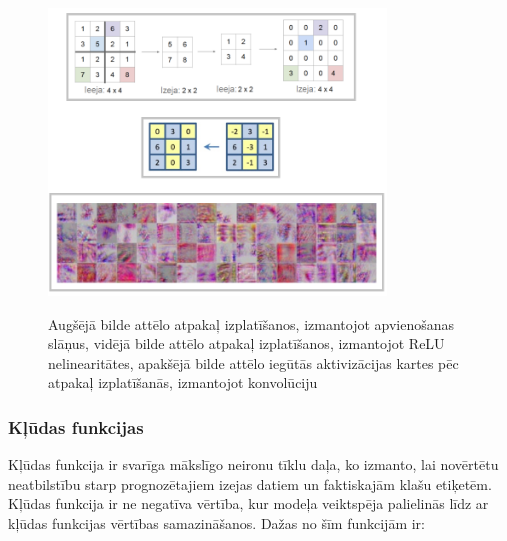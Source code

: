 \documentclass[12pt,paper=A4]{report}
\begin{document}
\begin{figure}[H] \centering
\includegraphics[width=0.80\textwidth]{maxPoolingDDD} 
\caption{Augšējā bilde attēlo atpakaļ izplatīšanos, izmantojot apvienošanas slāņus, vidējā bilde attēlo atpakaļ izplatīšanos, izmantojot ReLU nelinearitātes, apakšējā bilde attēlo iegūtās aktivizācijas kartes pēc atpakaļ izplatīšanās, izmantojot konvolūciju} 
\cite{masdasdIII} \cite{zeilerDed}
 \label{zeiler} 
\end{figure}



\subsubsection{Kļūdas funkcijas}
Kļūdas funkcija ir svarīga mākslīgo neironu tīklu daļa, ko izmanto, lai novērtētu neatbilstību starp prognozētajiem izejas datiem un faktiskajām klašu etiķetēm. Kļūdas funkcija ir ne negatīva vērtība, kur modeļa veiktspēja palielinās līdz ar kļūdas funkcijas vērtības samazināšanos. 
Dažas no šīm funkcijām ir: 
\end{document}
